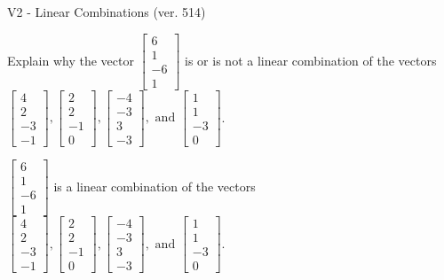 \begin{exercise}
  \begin{exerciseTitle}V2 - Linear Combinations (ver. 514)\end{exerciseTitle}
  \begin{exerciseStatement}
    Explain why the vector \(\left[\begin{array}{c}
6 \\
1 \\
-6 \\
1
\end{array}\right]\)  is or is not a linear 
	combination of the vectors \(\left[\begin{array}{c}
4 \\
2 \\
-3 \\
-1
\end{array}\right] , \left[\begin{array}{c}
2 \\
2 \\
-1 \\
0
\end{array}\right] , \left[\begin{array}{c}
-4 \\
-3 \\
3 \\
-3
\end{array}\right] , \text{ and } \left[\begin{array}{c}
1 \\
1 \\
-3 \\
0
\end{array}\right]\).
	


  \end{exerciseStatement}
  \begin{exerciseAnswer}
   \(\left[\begin{array}{c}
6 \\
1 \\
-6 \\
1
\end{array}\right]\) 
  	 is  
	a linear combination of the vectors \(\left[\begin{array}{c}
4 \\
2 \\
-3 \\
-1
\end{array}\right] , \left[\begin{array}{c}
2 \\
2 \\
-1 \\
0
\end{array}\right] , \left[\begin{array}{c}
-4 \\
-3 \\
3 \\
-3
\end{array}\right] , \text{ and } \left[\begin{array}{c}
1 \\
1 \\
-3 \\
0
\end{array}\right]\).


\end{exerciseAnswer}
\end{exercise}
